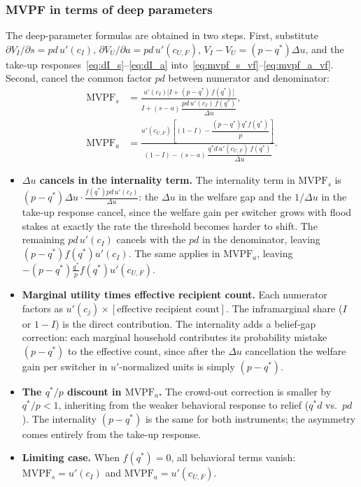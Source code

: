 \documentclass[12pt]{article}
\begin{document}
\subsubsection*{MVPF in terms of deep parameters}

The deep-parameter formulas are obtained in two steps. First, substitute $\partial V_I/\partial s=pd\,u'(c_I)$, $\partial V_U/\partial a=pd\,u'(c_{U,F})$, $V_I-V_U=(p-q^*)\Delta u$, and the take-up responses~\eqref{eq:dI_s}--\eqref{eq:dI_a} into~\eqref{eq:mvpf_s_vf}--\eqref{eq:mvpf_a_vf}. Second, cancel the common factor $pd$ between numerator and denominator:
\begin{align}
    \text{MVPF}_s &= \frac{u'(c_I)\bigl[I + (p-q^*)\,f(q^*)\bigr]}{I + (s-a)\,\dfrac{pd\,u'(c_I)\,f(q^*)}{\Delta u}}, \label{eq:mvpf_s} \\[14pt]
    \text{MVPF}_a &= \frac{u'(c_{U,F})\!\left[(1-I) - \dfrac{(p-q^*)q^*f(q^*)}{p}\right]}{(1-I) - (s-a)\,\dfrac{q^*d\,u'(c_{U,F})\,f(q^*)}{\Delta u}}. \label{eq:mvpf_a}
\end{align}

\begin{itemize}
    \item \textbf{$\Delta u$ cancels in the internality term.} The internality term in $\mathrm{MVPF}_s$ is $(p-q^*)\Delta u\cdot\frac{f(q^*)pd\,u'(c_I)}{\Delta u}$: the $\Delta u$ in the welfare gap and the $1/\Delta u$ in the take-up response cancel, since the welfare gain per switcher grows with flood stakes at exactly the rate the threshold becomes harder to shift. The remaining $pd\,u'(c_I)$ cancels with the $pd$ in the denominator, leaving $(p-q^*)f(q^*)u'(c_I)$. The same applies in $\mathrm{MVPF}_a$, leaving $-(p-q^*)\frac{q^*}{p}f(q^*)u'(c_{U,F})$.

    \item \textbf{Marginal utility times effective recipient count.} Each numerator factors as $u'(c_j)\times[\text{effective recipient count}]$. The inframarginal share ($I$ or $1-I$) is the direct contribution. The internality adds a belief-gap correction: each marginal household contributes its probability mistake $(p-q^*)$ to the effective count, since after the $\Delta u$ cancellation the welfare gain per switcher in $u'$-normalized units is simply $(p-q^*)$.

    \item \textbf{The $q^*/p$ discount in $\mathrm{MVPF}_a$.} The crowd-out correction is smaller by $q^*/p<1$, inheriting from the weaker behavioral response to relief ($q^*d$ vs.\ $pd$). The internality $(p-q^*)$ is the same for both instruments; the asymmetry comes entirely from the take-up response.

    \item \textbf{Limiting case.} When $f(q^*)=0$, all behavioral terms vanish: $\mathrm{MVPF}_s=u'(c_I)$ and $\mathrm{MVPF}_a=u'(c_{U,F})$. 
\end{itemize}
\end{document}
